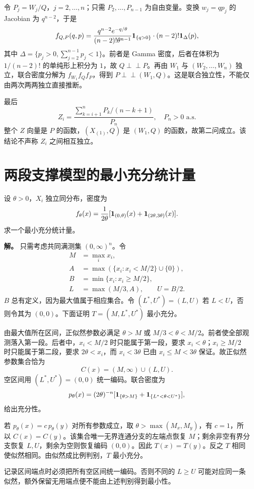 令 $P_j=W_j/Q$，$j=2,\ldots,n$；只需 $P_2,\ldots,P_{n-1}$ 为自由变量。变换 $w_j=qp_j$ 的 Jacobian 为 $q^{n-2}$，于是
\[
 f_{Q,P}(q,p)=
 \frac{q^{n-2}e^{-q/\theta}}{(n-2)!\theta^{n-1}}\mathbf 1_{\{q>0\}}
 \cdot (n-2)!\mathbf 1_{\Delta}(p),
\]
其中 $\Delta=\{p_j>0,\sum_{j=2}^{n-1}p_j<1\}$。前者是 Gamma 密度，后者在体积为 $1/(n-2)!$ 的单纯形上积分为 $1$，故 $Q\perp\!\!\!\perp P$。再由 $W_1$ 与 $(W_2,\ldots,W_n)$ 独立，联合密度分解为
$f_{W_1}f_Qf_P$，得到 $P\perp\!\!\!\perp(W_1,Q)$。这是联合独立性，不能仅由两次两两独立直接推断。

最后
\[
 Z_i=\frac{\sum_{k=i+1}^nP_k/(n-k+1)}{P_n},\quad P_n>0\text{ a.s.}
\]
整个 $Z$ 向量是 $P$ 的函数，$(X_{(1)},Q)$ 是 $(W_1,Q)$ 的函数，故第二问成立。该结论不声称 $Z_i$ 之间相互独立。

\section{两段支撑模型的最小充分统计量}
设 $\theta>0$，$X_i$ 独立同分布，密度为
\[
 f_\theta(x)=\frac1{2\theta}
 [\mathbf 1_{(0,\theta)}(x)+\mathbf 1_{(2\theta,3\theta)}(x)].
\]
求一个最小充分统计量。

\textbf{解。} 只需考虑共同满测集 $(0,\infty)^n$。令
\[
\begin{aligned}
 M&=\max_i x_i,\\
 A&=\max(\{x_i:x_i<M/2\}\cup\{0\}),\\
 B&=\min\{x_i:x_i\ge M/2\},\\
 L&=\max(M/3,A),\qquad U=B/2.
\end{aligned}
\]
$B$ 总有定义，因为最大值属于相应集合。令 $(L^*,U^*)=(L,U)$ 若 $L<U$，否则令其为 $(0,0)$。下面证明 $T=(M,L^*,U^*)$ 最小充分。

由最大值所在区间，正似然参数必满足 $\theta>M$ 或 $M/3<\theta<M/2$。前者使全部观测落入第一段。后者中，$x_i<M/2$ 时只能属于第一段，要求 $x_i<\theta$；$x_i\ge M/2$ 时只能属于第二段，要求 $2\theta<x_i$，而 $x_i<3\theta$ 已由 $x_i\le M<3\theta$ 保证。故正似然参数集合恰为
\[
 C(x)=(M,\infty)\cup(L,U).
\]
空区间用 $(L^*,U^*)=(0,0)$ 统一编码。联合密度为
\[
 p_\theta(x)=(2\theta)^{-n}
 [\mathbf 1_{\{\theta>M\}}+\mathbf 1_{\{L^*<\theta<U^*\}}],
\]
给出充分性。

若 $p_\theta(x)=c\,p_\theta(y)$ 对所有参数成立，取 $\theta>\max(M_x,M_y)$，有 $c=1$，所以 $C(x)=C(y)$。该集合唯一无界连通分支的左端点恢复 $M$；剩余非空有界分支恢复 $L,U$，剩余为空则恢复编码 $(0,0)$。因此 $T(x)=T(y)$。反之 $T$ 相同使似然相同。由似然成比例判别，$T$ 最小充分。

\begin{notebox}[支撑与空区间]
记录区间端点时必须把所有空区间统一编码。否则不同的 $L\ge U$ 可能对应同一条似然，额外保留无用端点便不能由上述判别得到最小性。
\end{notebox}

